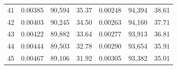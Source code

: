 \begin{tabular}{cccc|ccc}
41   & 0.00385                                                          & 90,594                                                                                            & 35.37                                                                                                                      & 0.00248                                                          & 94,394                                                                                            & 38.61                                                                                                                      \\
42   & 0.00403                                                          & 90,245                                                                                            & 34.50                                                                                                                      & 0.00263                                                          & 94,160                                                                                            & 37.71                                                                                                                      \\
43   & 0.00422                                                          & 89,882                                                                                            & 33.64                                                                                                                      & 0.00277                                                          & 93,913                                                                                            & 36.81                                                                                                                      \\
44   & 0.00444                                                          & 89,503                                                                                            & 32.78                                                                                                                      & 0.00290                                                          & 93,654                                                                                            & 35.91                                                                                                                      \\
45   & 0.00467                                                          & 89,106                                                                                            & 31.92                                                                                                                      & 0.00305                                                          & 93,382                                                                                            & 35.01                                                                                                                      \\

\end{tabular}
